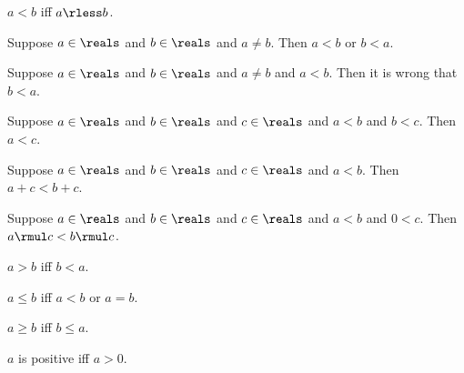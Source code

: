 \begin{abbreviation}\label{real_lt}
    $a < b$ iff $a \rless b$.
\end{abbreviation}

\begin{axiom}\label{real_lt_trichotomy}
    Suppose $a\in\reals$ and $b\in\reals$ and $a\neq b$.
    Then $a < b$ or $b < a$.
\end{axiom}

\begin{axiom}\label{real_lt_asym}
    Suppose $a\in\reals$ and $b\in\reals$ and $a\neq b$ and $a < b$.
    Then it is wrong that $b < a$.
\end{axiom}

\begin{axiom}\label{real_lt_trans}
    Suppose $a\in\reals$ and $b\in\reals$ and $c\in\reals$ and $a < b$ and $b < c$.
    Then $a < c$.
\end{axiom}

\begin{axiom}\label{real_lt_add}
    Suppose $a\in\reals$ and $b\in\reals$ and $c\in\reals$ and $a < b$.
    Then $a + c < b + c$.
\end{axiom}

\begin{axiom}\label{real_lt_mul_pos}
    Suppose $a\in\reals$ and $b\in\reals$ and $c\in\reals$ and $a < b$ and $0 < c$.
    Then $a \rmul c < b \rmul c$.
\end{axiom}

\begin{abbreviation}\label{real_gt}
    $a > b$ iff $b < a$.
\end{abbreviation}

\begin{abbreviation}\label{real_at_most}
    $a \leq b$ iff $a < b$ or $a = b$.
\end{abbreviation}

\begin{abbreviation}\label{real_at_least}
    $a \geq b$ iff $b \leq a$.
\end{abbreviation}

\begin{abbreviation}\label{real_positive}
    $a$ is positive iff $a > 0$.
\end{abbreviation}

